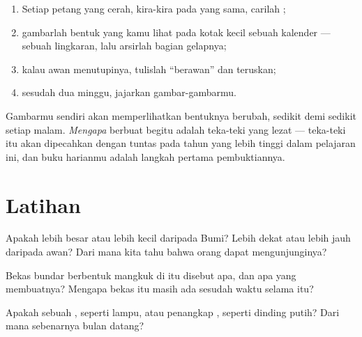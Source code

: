 \begin{method}\label{met:g2:moon-in-the-sky:diary}
\begin{enumerate}
  \item Setiap petang yang cerah, kira-kira pada  yang sama,
        carilah ;
  \item gambarlah bentuk yang kamu lihat pada kotak kecil sebuah
        kalender --- sebuah lingkaran, lalu arsirlah bagian gelapnya;
  \item kalau awan menutupinya, tulislah ``berawan'' dan teruskan;
  \item sesudah dua minggu, jajarkan gambar-gambarmu.
\end{enumerate}
Gambarmu sendiri akan memperlihatkan bentuknya berubah, sedikit demi
sedikit setiap malam. \emph{Mengapa}  berbuat begitu adalah
teka-teki yang lezat --- teka-teki itu akan dipecahkan dengan tuntas
pada tahun yang lebih tinggi dalam pelajaran ini, dan buku harianmu
adalah langkah pertama pembuktiannya.
\end{method}

\section{Latihan}

\begin{exercise}[$\star$]\label{exo:g2:moon-in-the-sky:1}
Apakah  lebih besar atau lebih kecil daripada Bumi? Lebih dekat
atau lebih jauh daripada awan? Dari mana kita tahu bahwa orang dapat
mengunjunginya?
\end{exercise}

\begin{exercise}[$\star$]\label{exo:g2:moon-in-the-sky:2}
Bekas bundar berbentuk mangkuk di  itu disebut apa, dan apa yang
membuatnya? Mengapa bekas itu masih ada sesudah waktu selama itu?
\end{exercise}

\begin{exercise}[$\star$]\label{exo:g2:moon-in-the-sky:3}
Apakah  sebuah , seperti lampu, atau penangkap
, seperti dinding putih? Dari mana sebenarnya  bulan
datang?
\end{exercise}

